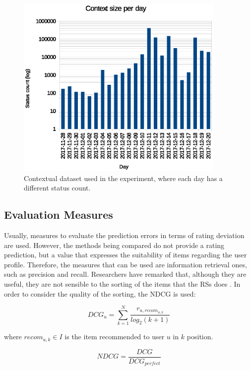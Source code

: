 \documentclass[preprint]{elsarticle}
\begin{document}
\begin{spacing}{1.5}
\begin{figure}[htb]
    \centering
    \includegraphics[width=0.9\textwidth]{figures/context-dataset-description.eps}
    \caption{Contextual dataset used in the experiment, where each day has a different status count.}
    \label{fig:context-dataset-description}
\end{figure}

\subsection{Evaluation Measures}

Usually, measures to evaluate the prediction errors in terms of rating deviation are used. However, the methods being compared do not provide a rating prediction, but a value that expresses the suitability of items regarding the user profile. Therefore, the measures that can be used are information retrieval ones, such as precision and recall. Researchers have remarked that, although they are useful, they are not sensible to the sorting of the items that the RSs does \cite{Gunawardana2015}. In order to consider the quality of the sorting, the NDCG is used:

\begin{equation}
	DCG_u = \sum_{k=1}^N\frac{r_{u,recom_{u,k}}}{log_2 (k+1)}
\end{equation}

\noindent where $recom_{u,k} \in I$ is the item recommended to user $u$ in $k$ position.

\begin{equation}
	NDCG = \frac{DCG}{DCG_{perfect}}
\end{equation}


\end{spacing}
\end{document}
